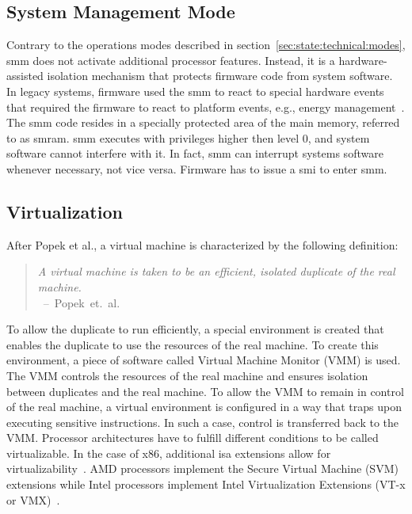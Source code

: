 \subsection{System Management Mode}
\label{sec:state:technical:smm}
Contrary to the operations modes described in
section~\ref{sec:state:technical:modes}, \gls{smm} does not activate additional
processor features. Instead, it is a hardware-assisted isolation mechanism that
protects firmware code from system software. In legacy systems, firmware used
the \gls{smm} to react to special hardware events that required the firmware to
react to platform events, e.g., energy management~\cite{intel_sdm}. The
\gls{smm} code resides in a specially protected area of the main memory,
referred to as \gls{smram}. \gls{smm} executes with privileges higher then level
0, and system software cannot interfere with it. In fact, \gls{smm} can
interrupt systems software whenever necessary, not vice versa. Firmware has to
issue a \gls{smi} to enter \gls{smm}.

\subsection{Virtualization}
\label{sec:state:technical:virt}
After Popek et al., a virtual machine is characterized by the following
definition:
\begin{quote}
  \textit{ A virtual machine is taken to be an efficient, isolated duplicate of
    the real machine. \\
  } \mbox{ -- Popek et. al. ~\cite{popek1974formal}}
\end{quote}
To allow the duplicate to run efficiently, a special environment is created that
enables the duplicate to use the resources of the real machine. To create this
environment, a piece of software called Virtual Machine Monitor (VMM) is used.
The VMM controls the resources of the real machine and ensures isolation between
duplicates and the real machine. To allow the VMM to remain in control of the
real machine, a virtual environment is configured in a way that traps upon
executing sensitive instructions. In such a case, control is transferred back to
the VMM. Processor architectures have to fulfill different conditions to be
called virtualizable. In the case of x86, additional \gls{isa} extensions
allow for virtualizability~\cite {adams2006comparison}. AMD processors
implement the Secure Virtual Machine (SVM) extensions while Intel processors
implement Intel Virtualization Extensions (VT-x or VMX)~\cite{amd_manual,
intel_sdm}.

